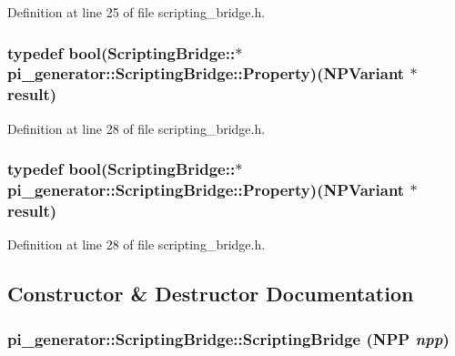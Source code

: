 Definition at line 25 of file scripting\_\-bridge.h.

\hypertarget{classpi__generator_1_1_scripting_bridge_abcd8cffa7f26f348e68cde316038245f}{
\subsubsection[{Property}]{\setlength{\rightskip}{0pt plus 5cm}typedef bool(ScriptingBridge::$\ast$ {\bf pi\_\-generator::ScriptingBridge::Property})(NPVariant $\ast$result)}}
\label{classpi__generator_1_1_scripting_bridge_abcd8cffa7f26f348e68cde316038245f}


Definition at line 28 of file scripting\_\-bridge.h.

\hypertarget{classpi__generator_1_1_scripting_bridge_abcd8cffa7f26f348e68cde316038245f}{
\subsubsection[{Property}]{\setlength{\rightskip}{0pt plus 5cm}typedef bool(ScriptingBridge::$\ast$ {\bf pi\_\-generator::ScriptingBridge::Property})(NPVariant $\ast$result)}}
\label{classpi__generator_1_1_scripting_bridge_abcd8cffa7f26f348e68cde316038245f}


Definition at line 28 of file scripting\_\-bridge.h.



\subsection{Constructor \& Destructor Documentation}
\hypertarget{classpi__generator_1_1_scripting_bridge_abcc778b6a4c482dff1ed271d7e776e42}{
\subsubsection[{ScriptingBridge}]{\setlength{\rightskip}{0pt plus 5cm}pi\_\-generator::ScriptingBridge::ScriptingBridge ({\bf NPP} {\em npp})}}
\label{classpi__generator_1_1_scripting_bridge_abcc778b6a4c482dff1ed271d7e776e42}


